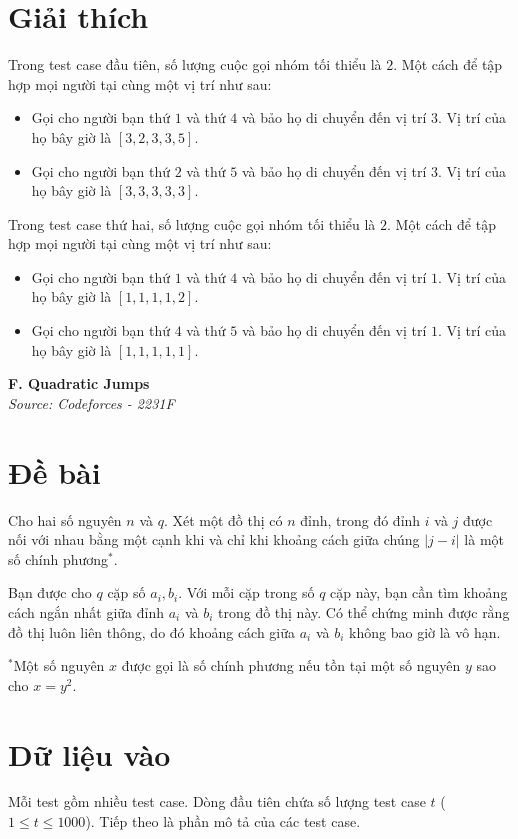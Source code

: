 \documentclass[11pt]{article}
\newcommand{\problem}[2]{
    \begin{problembox}
    \begin{center}
        \Large \textbf{#1} \\
        \vspace{0.2cm}
        \small \textit{Source: #2}
    \end{center}
    \end{problembox}
}
\begin{document}
\section*{Giải thích}
Trong test case đầu tiên, số lượng cuộc gọi nhóm tối thiểu là $2$. Một cách để tập hợp mọi người tại cùng một vị trí như sau:
\begin{itemize}
    \item Gọi cho người bạn thứ $1$ và thứ $4$ và bảo họ di chuyển đến vị trí $3$. Vị trí của họ bây giờ là $[3, 2, 3, 3, 5]$.
    \item Gọi cho người bạn thứ $2$ và thứ $5$ và bảo họ di chuyển đến vị trí $3$. Vị trí của họ bây giờ là $[3, 3, 3, 3, 3]$.
\end{itemize}

Trong test case thứ hai, số lượng cuộc gọi nhóm tối thiểu là $2$. Một cách để tập hợp mọi người tại cùng một vị trí như sau:
\begin{itemize}
    \item Gọi cho người bạn thứ $1$ và thứ $4$ và bảo họ di chuyển đến vị trí $1$. Vị trí của họ bây giờ là $[1, 1, 1, 1, 2]$.
    \item Gọi cho người bạn thứ $4$ và thứ $5$ và bảo họ di chuyển đến vị trí $1$. Vị trí của họ bây giờ là $[1, 1, 1, 1, 1]$.
\end{itemize}

\newpage
\problem{F. Quadratic Jumps}{Codeforces - 2231F}

\section*{Đề bài}
Cho hai số nguyên $n$ và $q$. Xét một đồ thị có $n$ đỉnh, trong đó đỉnh $i$ và $j$ được nối với nhau bằng một cạnh khi và chỉ khi khoảng cách giữa chúng $|j - i|$ là một số chính phương$^*$.

Bạn được cho $q$ cặp số $a_i, b_i$. Với mỗi cặp trong số $q$ cặp này, bạn cần tìm khoảng cách ngắn nhất giữa đỉnh $a_i$ và $b_i$ trong đồ thị này. Có thể chứng minh được rằng đồ thị luôn liên thông, do đó khoảng cách giữa $a_i$ và $b_i$ không bao giờ là vô hạn.

$^*$Một số nguyên $x$ được gọi là số chính phương nếu tồn tại một số nguyên $y$ sao cho $x = y^2$.

\section*{Dữ liệu vào}
Mỗi test gồm nhiều test case. Dòng đầu tiên chứa số lượng test case $t$ ($1 \le t \le 1000$). Tiếp theo là phần mô tả của các test case.
\end{document}

